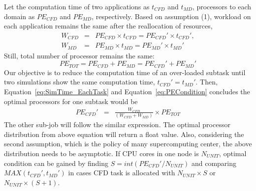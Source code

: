 \documentclass[conference,final]{IEEEtran}
\begin{document}



Let the computation time of two applications as $t_{CFD}$ and $t_{MD}$, processors to each domain as $PE_{CFD}$ and $PE_{MD}$, respectively. Based on assumption (1), workload on each application remains the same after the reallocation of resources,
\begin{eqnarray}
W_{CFD} &=& PE_{CFD} \times t_{CFD} = PE_{CFD}' \times t_{CFD}', \nonumber \\
W_{MD} &=& PE_{MD} \times t_{MD} = PE_{MD}' \times t_{MD}'
\label{eq:SimTime_EachTask}
\end{eqnarray}
Still, total number of processor remains the same:
\begin{equation}
PE_{TOT} = PE_{CFD} + PE_{MD} = PE_{CFD}' + PE_{MD}'
\label{eq:PECondition}
\end{equation}
Our objective is to reduce the computation time of an over-loaded subtask until two simulations show the same computation time, $t_{CFD}' = t_{MD}'$. Then, Equation~\ref{eq:SimTime_EachTask} and Equation~\ref{eq:PECondition} concludes the optimal processors for one subtask would be
\begin{eqnarray}
PE_{CFD}' & = & \frac {W_{CFD}} {(W_{CFD} + W_{MD})} \times PE_{TOT}
\end{eqnarray}
The other sub-job will follow the similar expression.
The optimal processor distribution from above equation will return a float value. Also, considering the second assumption, which is the policy of many supercomputing center, the above distribution needs to be asymptotic. If CPU cores in one node is $N_{UNIT}$,
optimal condition can be gained by finding $S = int(PE_{CFD}' / N_{UNIT})$ and comparing $MAX(t_{CFD}',t_{MD}')$ in cases CFD task is allocated with $N_{UNIT} \times S$ or $N_{UNIT} \times (S+1)$.
\end{document}
